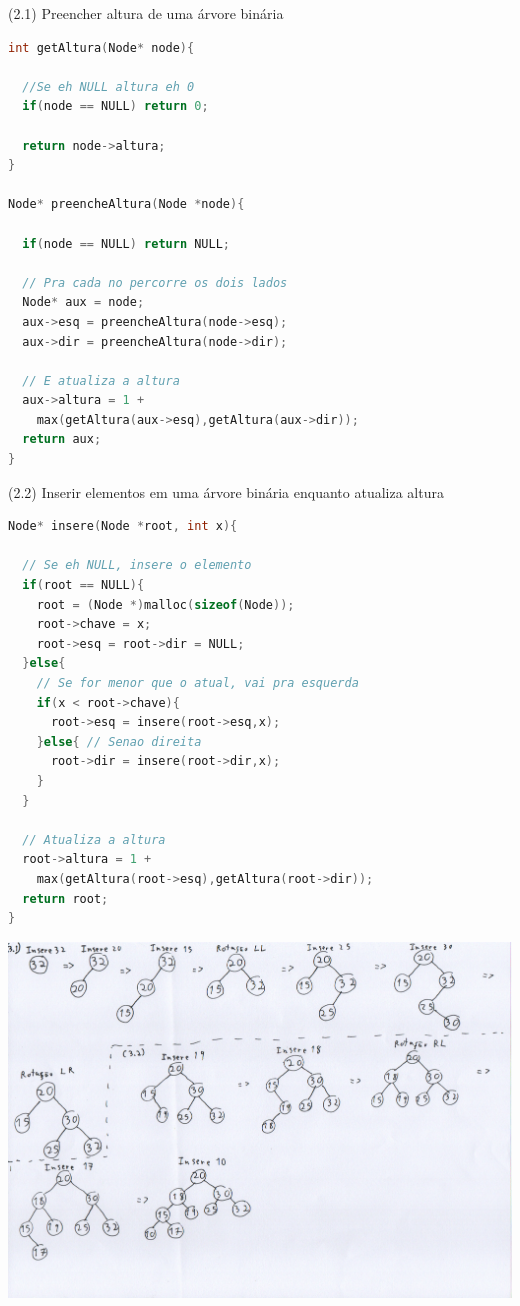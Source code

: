 \documentclass{homework}
\begin{document}
\exercise
(2.1) Preencher altura de uma árvore binária
\begin{lstlisting}[language=C]
int getAltura(Node* node){

  //Se eh NULL altura eh 0
  if(node == NULL) return 0;
  
  return node->altura;
}

Node* preencheAltura(Node *node){

  if(node == NULL) return NULL;
  
  // Pra cada no percorre os dois lados
  Node* aux = node;
  aux->esq = preencheAltura(node->esq);
  aux->dir = preencheAltura(node->dir);
  
  // E atualiza a altura
  aux->altura = 1 +
    max(getAltura(aux->esq),getAltura(aux->dir));
  return aux;
}
\end{lstlisting}
(2.2) Inserir elementos em uma árvore binária enquanto atualiza altura
\begin{lstlisting}[language=C]
Node* insere(Node *root, int x){

  // Se eh NULL, insere o elemento
  if(root == NULL){
    root = (Node *)malloc(sizeof(Node));
    root->chave = x;
    root->esq = root->dir = NULL; 
  }else{
    // Se for menor que o atual, vai pra esquerda
    if(x < root->chave){
      root->esq = insere(root->esq,x);
    }else{ // Senao direita
      root->dir = insere(root->dir,x);
    }
  }
  
  // Atualiza a altura
  root->altura = 1 +
    max(getAltura(root->esq),getAltura(root->dir));
  return root;
}
\end{lstlisting}

\exercise
\includegraphics[scale=0.22]{images/q3.pdf}
\end{document}
